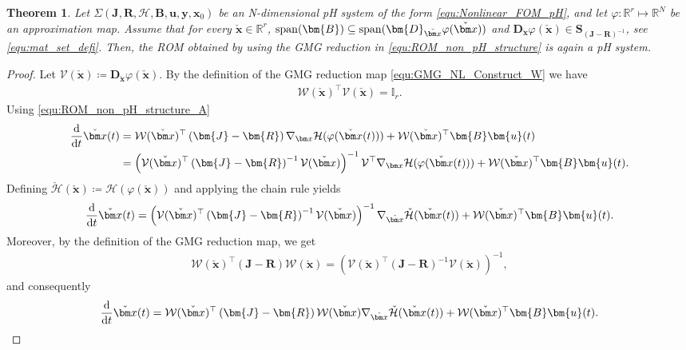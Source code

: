 \documentclass{article}
\newtheorem{theorem}{Theorem}[section]
\newcommand{\bmB}{\bm{B}}
\newcommand{\bmD}{\bm{D}}
\newcommand{\R}{\mathbb{R}}
\newcommand{\curlyH}{\mathcal{H}}
\newcommand{\curlyHr}{\check{\mathcal{H}}}
\newcommand{\statex}{{\bm x}}
\newcommand{\outputy}{{\bm y}}
\newcommand{\stateRed}{\check{\bm x}}
\newcommand{\stateRedT}{\stateRed(t)}
\newcommand{\inputu}{\bm{u}}
\newcommand{\ddt}{\frac{\rm d}{{\rm d} t}}
\newcommand{\SysLable}{\Sigma}
\newcommand{\FOMsize}{N}
\newcommand{\ROMsize}{r}
\newcommand{\approxfunc}{\varphi}
\newcommand{\matset}{\mathbf{S}}
\newcommand{\funcV}{\mathcal{V}}
\newcommand{\funcW}{\mathcal{W}}
\newcommand{\funcJ}{\bm{J}}
\newcommand{\funcR}{\bm{R}}
\newcommand{\JacRed}{\bmD_{\stateRed}\approxfunc(\stateRed)}
\newcommand{\pH}{\textsf{pH}\xspace}
\newcommand{\GMG}{\textsf{GMG}\xspace}
\newcommand{\ROM}{\textsf{ROM}\xspace}
\begin{document}
\begin{theorem}
\label{Theo:pH_structure}
Let $\SysLable(\funcJ,\funcR,\curlyH,\bmB, \inputu,\outputy,\statex_0)$ be an N-dimensional \pH system of the form \eqref{equ:Nonlinear_FOM_pH}, and let  $\approxfunc\colon\R^{\ROMsize}\mapsto\R^{\FOMsize}$ be an approximation map. Assume that for every $\stateRed\in\R^{\ROMsize}$, ${\rm span}(\bmB)\subseteq {\rm span}(\JacRed)$ and $\bmD_{\stateRed}\approxfunc(\stateRed)\in\matset_{\left(\funcJ-\funcR\right)^{-1}}$, see \eqref{equ:mat_set_defi}. Then, the \ROM obtained by using the \GMG reduction in \eqref{equ:ROM_non_pH_structure} is again a \pH system.
\end{theorem}
\begin{proof}
Let $\funcV(\stateRed)\coloneq\bmD_{\stateRed}\approxfunc(\stateRed)$. By the definition of the \GMG reduction map \eqref{equ:GMG_NL_Construct_W}
we have \begin{align*}\funcW(\stateRed)^{\top} \funcV(\stateRed) = \mathbb{I}_r.\end{align*} 
Using \eqref{equ:ROM_non_pH_structure_A}
\begin{align*}
		\ddt \stateRedT &=
		\funcW(\stateRed)^{\top}\left(\funcJ-\funcR \right)\nabla_{\statex}\curlyH(\approxfunc(\stateRedT)) + \funcW(\stateRed)^{\top}\bmB\inputu(t) \\
		&= \left( \funcV(\stateRed)^{\top}\left(\funcJ-\funcR \right)^{-1} \funcV(\stateRed) \right)^{-1} \funcV^{\top} \nabla_{\statex}\curlyH(\approxfunc(\stateRedT)) + \funcW(\stateRed)^{\top}\bmB\inputu(t). 
\end{align*}
Defining $	\curlyHr(\stateRed) \coloneq \curlyH(\approxfunc(\stateRed))$ and applying the chain rule yields
\begin{align*}
	\ddt \stateRedT =\left( \funcV(\stateRed)^{\top}\left(\funcJ-\funcR \right)^{-1} \funcV(\stateRed) \right)^{-1}  \nabla_{\stateRed}\curlyHr(\stateRedT)  + \funcW(\stateRed)^{\top}\bmB\inputu(t).
\end{align*}
Moreover, by the definition of the \GMG reduction map, we get 
\begin{align*}
	\funcW(\stateRed)^{\top}\left(\funcJ-\funcR \right) \funcW(\stateRed) = \left( \funcV(\stateRed)^{\top}\left(\funcJ-\funcR \right)^{-1} \funcV(\stateRed) \right)^{-1},
\end{align*}
and consequently
\begin{align*}
	\ddt \stateRedT =\funcW(\stateRed)^{\top}\left(\funcJ-\funcR \right) \funcW(\stateRed)  \nabla_{\stateRed}\curlyHr(\stateRedT)  + \funcW(\stateRed)^{\top}\bmB\inputu(t).

\end{align*}
\end{proof}
\end{document}
